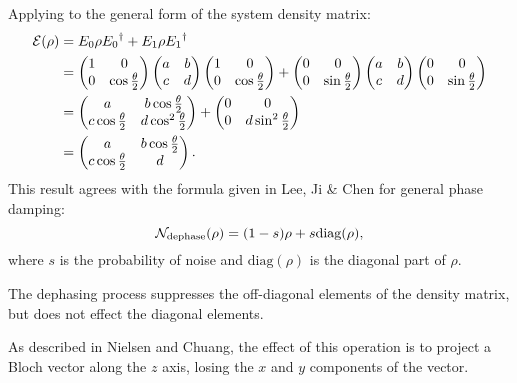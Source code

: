 \documentclass[12pt]{extarticle}
\begin{document}
Applying to the general form of the system density matrix:
\begin{align*}
\mathcal{E}(\rho) & = E_0 \rho {E_0}^\dagger + E_1 \rho {E_1}^\dagger \\
& = \begin{pmatrix}1 & 0 \\ 0 & \cos\frac{\theta}{2}\end{pmatrix} \begin{pmatrix}a & b \\ c & d\end{pmatrix} \begin{pmatrix}1 & 0 \\ 0 & \cos\frac{\theta}{2}\end{pmatrix}
+ \begin{pmatrix}0 & 0 \\ 0 & \sin\frac{\theta}{2}\end{pmatrix} \begin{pmatrix}a & b \\ c & d\end{pmatrix} \begin{pmatrix}0 & 0 \\ 0 & \sin\frac{\theta}{2}\end{pmatrix} \\
& = \begin{pmatrix}a & b\cos\frac{\theta}{2} \\ c\cos\frac{\theta}{2} & d\cos^2\frac{\theta}{2}\end{pmatrix} + \begin{pmatrix}0 & 0 \\ 0 & d\sin^2\frac{\theta}{2}\end{pmatrix} \\
& = \begin{pmatrix}a & b\cos\frac{\theta}{2} \\ c\cos\frac{\theta}{2} & d\end{pmatrix}.
\end{align*}
This result agrees with the formula given in Lee, Ji \& Chen\cite{lee2024} for general phase damping:
\[
\mathcal{N}_{\text{dephase}}(\rho) = (1-s)\rho + s\text{diag}(\rho),
\]
where $s$ is the probability of noise and $\text{diag}(\rho)$ is the diagonal part of $\rho$.

The dephasing process suppresses the off-diagonal elements of the density matrix, but does not effect the diagonal elements.

As described in Nielsen and Chuang, the effect of this operation is to project a Bloch vector along the $z$ axis,
losing the $x$ and $y$ components of the vector.
\end{document}
